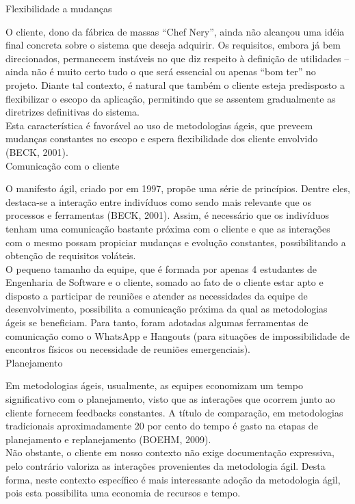\large{Flexibilidade a mudanças\\}


O cliente, dono da fábrica de massas “Chef Nery”, ainda não alcançou uma idéia final concreta sobre o sistema que deseja adquirir. Os requisitos, embora já bem direcionados, permanecem instáveis no que diz respeito à definição de utilidades – ainda não é muito certo tudo o que será essencial ou apenas “bom ter” no projeto. Diante tal contexto, é natural que também o cliente esteja predisposto a flexibilizar o escopo da aplicação, permitindo que se assentem gradualmente as diretrizes definitivas do sistema. \\
\tab Esta característica é favorável ao uso de metodologias ágeis, que preveem mudanças constantes no escopo e espera flexibilidade dos cliente envolvido (BECK, 2001). \\

\large{Comunicação com o cliente\\}

\tab O manifesto ágil, criado por  em 1997, propõe uma série de princípios. Dentre eles, destaca-se a interação entre indivíduos como sendo mais relevante que os processos e ferramentas  (BECK, 2001). Assim,  é necessário que os indivíduos tenham uma comunicação bastante próxima  com o cliente e que as interações com o mesmo possam propiciar mudanças e evolução constantes, possibilitando  a obtenção de requisitos voláteis. \\
\tab O pequeno tamanho da equipe, que é formada por apenas 4 estudantes de Engenharia de Software e o cliente, somado ao fato de o cliente estar apto e disposto a participar de reuniões e atender as necessidades da equipe de desenvolvimento, possibilita a comunicação próxima da qual as metodologias ágeis se beneficiam. Para tanto, foram adotadas algumas ferramentas de comunicação como o WhatsApp e Hangouts (para situações de impossibilidade de encontros físicos ou necessidade de reuniões emergenciais). \\


\large{Planejamento\\}

\tab Em metodologias ágeis, usualmente, as equipes economizam um tempo significativo com o planejamento, visto que as interações que ocorrem junto ao cliente fornecem feedbacks constantes. A título de comparação, em metodologias tradicionais aproximadamente 20 por cento do tempo é gasto na etapas de planejamento e replanejamento (BOEHM, 2009). \\
\tab Não obstante, o cliente em nosso contexto não exige documentação expressiva, pelo contrário valoriza as interações provenientes da metodologia ágil. Desta forma, neste contexto  específico é mais interessante adoção da metodologia ágil,  pois esta  possibilita uma economia de recursos e tempo. \\


